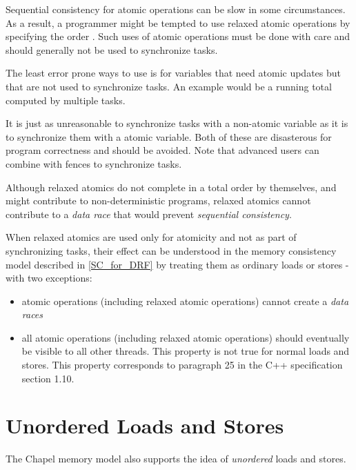 Sequential consistency for atomic operations can be slow in some
circumstances. As a result, a programmer might be tempted to use relaxed
atomic operations by specifying the order .
Such uses of atomic operations must be done with care and should generally
not be used to synchronize tasks.

The least error prone ways to use  is for
variables that need atomic updates but that are not used to synchronize
tasks. An example would be a running total computed by multiple tasks.

It is just as unreasonable to synchronize tasks with a non-atomic variable
as it is to synchronize them with a  atomic
variable. Both of these are disasterous for program correctness and should
be avoided. Note that advanced users can combine
 with fences to synchronize tasks.

Although relaxed atomics do not complete in a total order by themselves,
and might contribute to non-deterministic programs, relaxed atomics cannot
contribute to a \textit{data race} that would prevent \textit{sequential
consistency}.

When relaxed atomics are used only for atomicity and not as part of
synchronizing tasks, their effect can be understood in the memory
consistency model described in \ref{SC_for_DRF} by treating them as
ordinary loads or stores - with two exceptions:

\begin{itemize}

\item atomic operations (including relaxed atomic operations) cannot
create a \textit{data races}

\item all atomic operations (including relaxed atomic operations) should
eventually be visible to all other threads. This property is not true for
normal loads and stores. This property corresponds to paragraph 25 in the
C++ specification section 1.10.

\end{itemize}

\section{Unordered Loads and Stores}
The Chapel memory model also supports the idea of \textit{unordered} loads
and stores.


